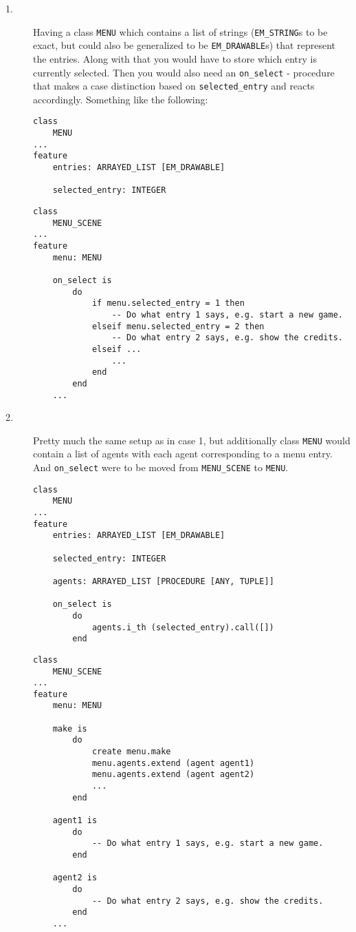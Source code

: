 \begin{description}
  \item[1.] Having a class \texttt{MENU} which contains a list of strings (\texttt{EM\_STRING}s to be exact, but could also be generalized to be \texttt{EM\_DRAWABLE}s) that represent the entries. Along with that you would have to store which entry is currently selected. Then you would also need an \texttt{on\_select} - procedure that makes a case distinction based on \texttt{selected\_entry} and reacts accordingly. Something like the following: 
    \begin{lstlisting}
class
	MENU
...
feature
	entries: ARRAYED_LIST [EM_DRAWABLE]
	
	selected_entry: INTEGER

    \end{lstlisting}
    \begin{lstlisting}
class
	MENU_SCENE
...
feature
	menu: MENU
	
	on_select is
		do
			if menu.selected_entry = 1 then
				-- Do what entry 1 says, e.g. start a new game.
	  		elseif menu.selected_entry = 2 then
				-- Do what entry 2 says, e.g. show the credits.
			elseif ...
				...
			end
		end
	...
    \end{lstlisting}
  \item[2.] Pretty much the same setup as in case 1, but additionally class \texttt{MENU} would contain a list of agents with each agent corresponding to a menu entry. And \texttt{on\_select} were to be moved from \texttt{MENU\_SCENE} to \texttt{MENU}.
    \begin{lstlisting}
class
	MENU
...
feature
	entries: ARRAYED_LIST [EM_DRAWABLE]
	
	selected_entry: INTEGER
	
	agents: ARRAYED_LIST [PROCEDURE [ANY, TUPLE]]

	on_select is
		do
			agents.i_th (selected_entry).call([])
		end

    \end{lstlisting}  
    \begin{lstlisting}
class
	MENU_SCENE
...
feature
	menu: MENU
	
	make is
		do
			create menu.make
			menu.agents.extend (agent agent1)
			menu.agents.extend (agent agent2)
			...
		end
		
	agent1 is
		do
			-- Do what entry 1 says, e.g. start a new game.
		end
		
	agent2 is
		do
			-- Do what entry 2 says, e.g. show the credits.
		end
	...
	

\end{lstlisting}
\end{description}
